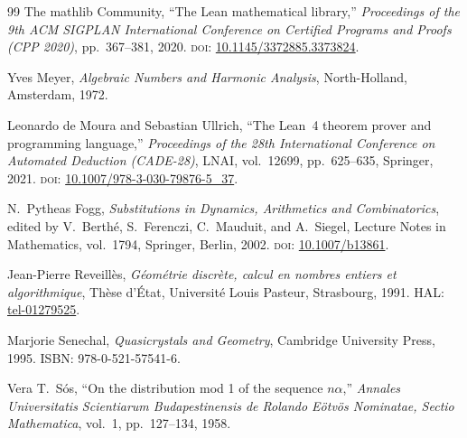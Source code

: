 \documentclass[11pt,reqno]{amsart}
\theoremstyle{plain}
\theoremstyle{definition}
\theoremstyle{remark}
\begin{document}
\begin{thebibliography}{99}
The mathlib Community,
``The Lean mathematical library,''
\emph{Proceedings of the 9th ACM SIGPLAN International Conference on
Certified Programs and Proofs (CPP 2020)},
pp.~367--381, 2020.
\textsc{doi}: \href{https://doi.org/10.1145/3372885.3373824}%
{10.1145/3372885.3373824}.

Yves Meyer,
\emph{Algebraic Numbers and Harmonic Analysis},
North-Holland, Amsterdam, 1972.

Leonardo de Moura and Sebastian Ullrich,
``The Lean~4 theorem prover and programming language,''
\emph{Proceedings of the 28th International Conference on Automated
Deduction (CADE-28)},
LNAI, vol.~12699, pp.~625--635, Springer, 2021.
\textsc{doi}: \href{https://doi.org/10.1007/978-3-030-79876-5_37}%
{10.1007/978-3-030-79876-5\_37}.

N.\ Pytheas Fogg,
\emph{Substitutions in Dynamics, Arithmetics and Combinatorics},
edited by V.\ Berth\'{e}, S.\ Ferenczi, C.\ Mauduit, and A.\ Siegel,
Lecture Notes in Mathematics, vol.~1794, Springer, Berlin, 2002.
\textsc{doi}: \href{https://doi.org/10.1007/b13861}{10.1007/b13861}.

Jean-Pierre Reveill\`{e}s,
\emph{G\'{e}om\'{e}trie discr\`{e}te, calcul en nombres entiers et
algorithmique},
Th\`{e}se d'\'{E}tat, Universit\'{e} Louis Pasteur, Strasbourg, 1991.
HAL: \href{https://theses.hal.science/tel-01279525}{tel-01279525}.

Marjorie Senechal,
\emph{Quasicrystals and Geometry},
Cambridge University Press, 1995.
ISBN: 978-0-521-57541-6.

Vera T.\ S\'{o}s,
``On the distribution mod 1 of the sequence \(n\alpha\),''
\emph{Annales Universitatis Scientiarum Budapestinensis de Rolando
E\"{o}tv\"{o}s Nominatae, Sectio Mathematica}, vol.~1, pp.~127--134, 1958.

\end{thebibliography}
\end{document}
